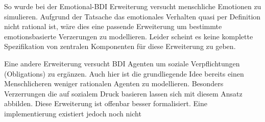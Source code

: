 So wurde bei der Emotional-BDI\cite{} %
Erweiterung versucht menschliche Emotionen zu simulieren.
Aufgrund der Tatsache das emotionales Verhalten quasi per Definition nicht rational ist, wäre dies eine passende Erweiterung um bestimmte emotionsbasierte Verzerungen zu modellieren.
Leider scheint es keine komplette Spezifikation von zentralen Komponenten für diese Erweiterung zu geben\cite[paragraph 4.16]{balke2014agents}.

Eine andere Erweiterung versucht BDI Agenten um soziale Verpflichtungen (Obligations) zu ergänzen.
Auch hier ist die grundliegende Idee bereits einen Menschlicheren weniger rationalen Agenten zu modellieren.
Besonders Verzerrungen die auf sozialem Druck basieren lassen sich mit diesem Ansatz abbilden.
Diese Erweiterung ist offenbar besser formalisiert.
Eine implementierung existiert jedoch noch nicht\cite[stand 2015]{balke2014agents}
